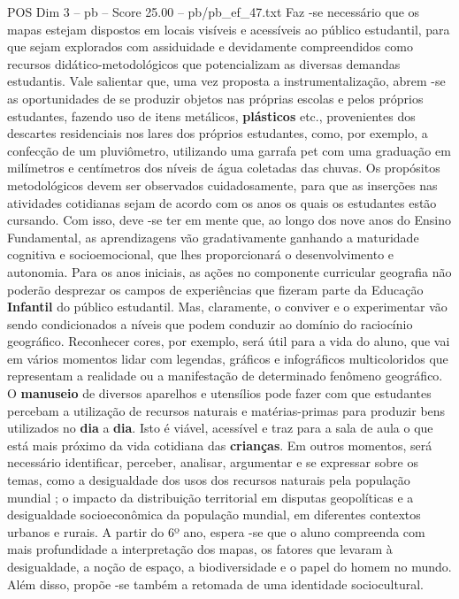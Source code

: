 \begin{textsample}{POS Dim 3 – pb – Score 25.00 – pb/pb\_ef\_47.txt}
Faz -se necessário que os mapas estejam dispostos em locais visíveis e acessíveis ao público estudantil, para que sejam explorados com assiduidade e devidamente compreendidos como recursos didático-metodológicos que potencializam as diversas demandas estudantis.
Vale salientar que, uma vez proposta a instrumentalização, abrem -se as oportunidades de se produzir objetos nas próprias escolas e pelos próprios estudantes, fazendo uso de itens metálicos, \textbf{plásticos} etc., provenientes dos descartes residenciais nos lares dos próprios estudantes, como, por exemplo, a confecção de um pluviômetro, utilizando uma garrafa pet com uma graduação em milímetros e centímetros dos níveis de água coletadas das chuvas.
Os propósitos metodológicos devem ser observados cuidadosamente, para que as inserções nas atividades cotidianas sejam de acordo com os anos os quais os estudantes estão cursando.
Com isso, deve -se ter em mente que, ao longo dos nove anos do Ensino Fundamental, as aprendizagens vão gradativamente ganhando a maturidade cognitiva e socioemocional, que lhes proporcionará o desenvolvimento e autonomia.
Para os anos iniciais, as ações no componente curricular geografia não poderão desprezar os campos de experiências que fizeram parte da Educação \textbf{Infantil} do público estudantil.
Mas, claramente, o conviver e o experimentar vão sendo condicionados a níveis que podem conduzir ao domínio do raciocínio geográfico.
Reconhecer cores, por exemplo, será útil para a vida do aluno, que vai em vários momentos lidar com legendas, gráficos e infográficos multicoloridos que representam a realidade ou a manifestação de determinado fenômeno geográfico.
O \textbf{manuseio} de diversos aparelhos e utensílios pode fazer com que estudantes percebam a utilização de recursos naturais e matérias-primas para produzir bens utilizados no \textbf{dia} a \textbf{dia}.
Isto é viável, acessível e traz para a sala de aula o que está mais próximo da vida cotidiana das \textbf{crianças}.
Em outros momentos, será necessário identificar, perceber, analisar, argumentar e se expressar sobre os temas, como a desigualdade dos usos dos recursos naturais pela população mundial ; o impacto da distribuição territorial em disputas geopolíticas e a desigualdade socioeconômica da população mundial, em diferentes contextos urbanos e rurais.
A partir do 6º ano, espera -se que o aluno compreenda com mais profundidade a interpretação dos mapas, os fatores que levaram à desigualdade, a noção de espaço, a biodiversidade e o papel do homem no mundo.
Além disso, propõe -se também a retomada de uma identidade sociocultural.

\end{textsample}
